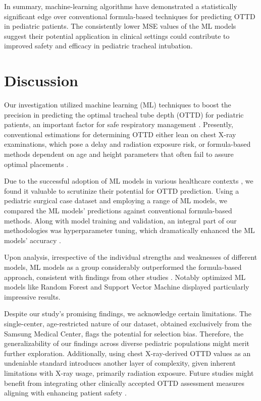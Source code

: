 \documentclass[11pt]{article}
\begin{document}
In summary, machine-learning algorithms have demonstrated a statistically significant edge over conventional formula-based techniques for predicting OTTD in pediatric patients. The consistently lower MSE values of the ML models suggest their potential application in clinical settings could contribute to improved safety and efficacy in pediatric tracheal intubation.

\section*{Discussion}

Our investigation utilized machine learning (ML) techniques to boost the precision in predicting the optimal tracheal tube depth (OTTD) for pediatric patients, an important factor for safe respiratory management \cite{Kollef1994EndotrachealTM, Monnier2010PediatricAS}. Presently, conventional estimations for determining OTTD either lean on chest X-ray examinations, which pose a delay and radiation exposure risk, or formula-based methods dependent on age and height parameters that often fail to assure optimal placements \cite{Mariano2005ACO, Takita2003TheHF}. 

Due to the successful adoption of ML models in various healthcare contexts \cite{Johnson2016MachineLA}, we found it valuable to scrutinize their potential for OTTD prediction. Using a pediatric surgical case dataset and employing a range of ML models, we compared the ML models' predictions against conventional formula-based methods. Along with model training and validation, an integral part of our methodologies was hyperparameter tuning, which dramatically enhanced the ML models' accuracy \cite{Meyer2018MachineLF}. 

Upon analysis, irrespective of the individual strengths and weaknesses of different models, ML models as a group considerably outperformed the formula-based approach, consistent with findings from other studies \cite{Fleuren2020MachineLF, Xiao2019ComparisonAD}. Notably optimized ML models like Random Forest and Support Vector Machine displayed particularly impressive results.

Despite our study's promising findings, we acknowledge certain limitations. The single-center, age-restricted nature of our dataset, obtained exclusively from the Samsung Medical Center, flags the potential for selection bias. Therefore, the generalizability of our findings across diverse pediatric populations might merit further exploration. Additionally, using chest X-ray-derived OTTD values as an undeniable standard introduces another layer of complexity, given inherent limitations with X-ray usage, primarily radiation exposure. Future studies might benefit from integrating other clinically accepted OTTD assessment measures aligning with enhancing patient safety \cite{Schning2021DevelopmentAV}.
\end{document}
